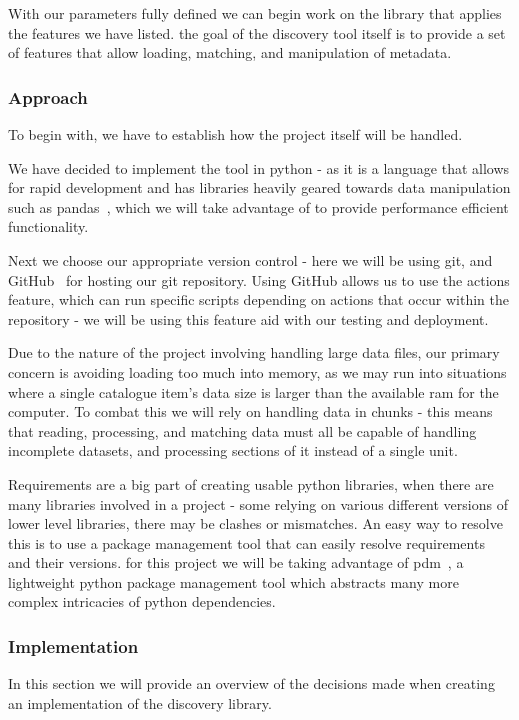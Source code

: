 With our parameters fully defined we can begin work on the library that applies the features we have listed.
the goal of the discovery tool itself is to provide a set of features that allow loading, matching, and manipulation
of metadata.

\subsubsection{Approach}
To begin with, we have to establish how the project itself will be handled.

We have decided to implement the tool in python - as it is a language that allows for rapid development and has
libraries heavily geared towards data manipulation such as pandas~\cite{PythonPandas}, which we will take advantage of
to provide performance efficient functionality.

Next we choose our appropriate version control - here we will be using git, and GitHub~\cite{GitHub} for hosting our git
repository.
Using GitHub allows us to use the actions feature, which can run specific scripts depending on actions that occur within
the repository - we will be using this feature aid with our testing and deployment.

Due to the nature of the project involving handling large data files, our primary concern is avoiding loading too much
into memory, as we may run into situations where a single catalogue item's data size is larger than the available ram
for the computer.
To combat this we will rely on handling data in chunks - this means that reading, processing, and matching data must
all be capable of handling incomplete datasets, and processing sections of it instead of a single unit.

Requirements are a big part of creating usable python libraries, when there are many libraries involved in a project -
some relying on various different versions of lower level libraries, there may be clashes or mismatches.
An easy way to resolve this is to use a package management tool that can easily resolve requirements and their versions.
for this project we will be taking advantage of pdm~\cite{PythonPDM}, a lightweight python package management tool which
abstracts many more complex intricacies of python dependencies.

\subsubsection{Implementation}
In this section we will provide an overview of the decisions made when creating an implementation of the discovery
library.


